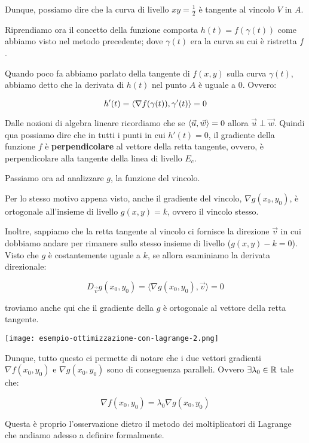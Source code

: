 Dunque, possiamo dire che la curva di livello \(xy = \frac{1}{2}\) è tangente al vincolo \(V\) in \(A\).

Riprendiamo ora il concetto della funzione composta \(h(t) = f(\gamma(t))\) come abbiamo visto nel metodo precedente; dove \(\gamma(t)\) era la curva su cui è ristretta \(f\).

Quando poco fa abbiamo parlato della tangente di \(f(x,y)\) sulla curva \(\gamma(t)\), abbiamo detto che la derivata di \(h(t)\) nel punto \(A\) è uguale a 0. Ovvero:

\[
    h'(t) = \langle\nabla f(\gamma(t)),\gamma'(t)\rangle = 0
\]

Dalle nozioni di algebra lineare ricordiamo che se \(\langle\vec{u},\vec{w}\rangle = 0\) allora \(\vec{u} \perp \vec{w}\). Quindi qua possiamo dire che in tutti i punti in cui \(h'(t) = 0\), il gradiente della funzione \(f\) è \textbf{perpendicolare} al vettore della retta tangente, ovvero, è perpendicolare alla tangente della linea di livello \(E_c\).

Passiamo ora ad analizzare \(g\), la funzione del vincolo.

Per lo stesso motivo appena visto, anche il gradiente del vincolo, \(\nabla g(x_0,y_0)\), è ortogonale all'insieme di livello \(g(x,y) = k\), ovvero il vincolo stesso.

Inoltre, sappiamo che la retta tangente al vincolo ci fornisce la direzione \(\vec{v}\) in cui dobbiamo andare per rimanere sullo stesso insieme di livello (\(g(x,y) - k=0\)). Visto che \(g\) è costantemente uguale a \(k\), se allora esaminiamo la derivata direzionale:

\[
    D_{\vec{v}} g(x_0,y_0) = \langle \nabla g(x_0,y_0), \vec{v} \rangle = 0
\]

troviamo anche qui che il gradiente della \(g\) è ortogonale al vettore della retta tangente.

\begin{center}
    \texttt{[image: esempio-ottimizzazione-con-lagrange-2.png]}
\end{center}

Dunque, tutto questo ci permette di notare che i due vettori gradienti \(\nabla f(x_0,y_0)\) e \(\nabla g(x_0,y_0)\) sono di conseguenza paralleli. Ovvero \(\exists \lambda_0 \in \mathbb{R} \) tale che:

\[
    \nabla f(x_0,y_0) = \lambda_0 \nabla g(x_0,y_0)
\]

Questa è proprio l'osservazione dietro il metodo dei moltiplicatori di Lagrange che andiamo adesso a definire formalmente.

